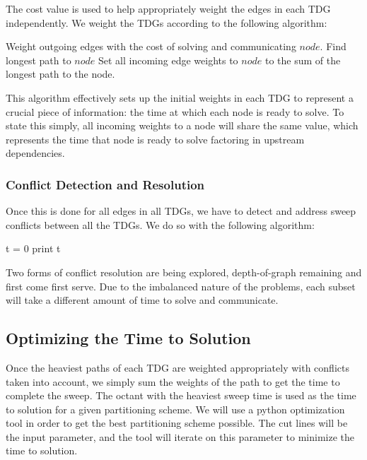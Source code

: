 \documentclass[11pt, letterpaper,titlepage,oneside]{article}
\begin{document}
The cost value is used to help appropriately weight the edges in each TDG independently. We weight the TDGs according to the following algorithm:

\begin{algorithm}[H]
\begin{algorithmic}[1]
\STATE Weight outgoing edges with the cost of solving and communicating $node$.
\ENDFOR
{}
\STATE Find longest path to $node$
\STATE Set all incoming edge weights to $node$ to the sum of the longest path to the node.
\ENDFOR
\label{universalweights}
\end{algorithmic}
\end{algorithm}

This algorithm effectively sets up the initial weights in each TDG to represent a crucial piece of information: the time at which each node is ready to solve. To state this simply, all incoming weights to a node will share the same value, which represents the time that node is ready to solve factoring in upstream dependencies. 

\subsubsection{Conflict Detection and Resolution}

Once this is done for all edges in all TDGs, we have to detect and address sweep conflicts between all the TDGs. We do so with the following algorithm:
\begin{algorithm}[H]
\begin{algorithmic}[2]
\STATE t = 0
\STATE print t
\ENDWHILE
\label{conflict}
\end{algorithmic}
\end{algorithm}


Two forms of conflict resolution are being explored, depth-of-graph remaining and first come first serve. Due to the imbalanced nature of the problems, each subset will take a different amount of time to solve and communicate. 

\subsection{Optimizing the Time to Solution}\label{optimize}

Once the heaviest paths of each TDG are weighted appropriately with conflicts taken into account, we simply sum the weights of the path to get the time to complete the sweep. The octant with the heaviest sweep time is used as the time to solution for a given partitioning scheme. We will use a python optimization tool in order to get the best partitioning scheme possible. The cut lines will be the input parameter, and the tool will iterate on this parameter to minimize the time to solution. 
\end{document}
